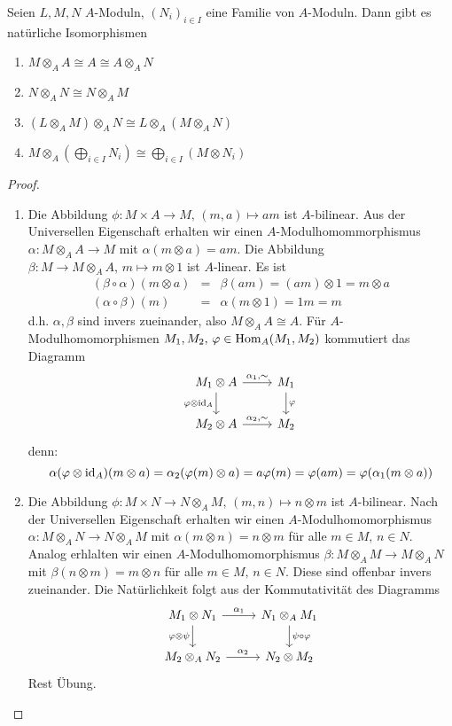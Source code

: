 \begin{bem}\label{13.7}
	Seien $L,M,N$ $A$-Moduln, $(N_i)_{i\in I}$ eine Familie von $A$-Moduln. Dann gibt es natürliche Isomorphismen 
	\begin{enumerate}[label= \alph*)]
		\item $M \otimes_A A \cong A \cong A \otimes_A N$
		\item $N\otimes_A N\cong N \otimes_A M$
		\item $(L\otimes_A M)\otimes_A N \cong L \otimes_A(M \otimes_A N)$
		\item $M \otimes_A \left(\bigoplus_{i\in I} N_i\right) \cong \bigoplus_{i\in I}(M \otimes N_i)$
	\end{enumerate}
\end{bem}
\begin{proof}
	\begin{enumerate}[label= \alph*)]
		\item Die Abbildung $\phi:M \times A \to M, \, (m,a) \mapsto am$ ist $A$-bilinear. Aus der Universellen Eigenschaft erhalten wir einen $A$-Modulhomommorphismus $\alpha:M \otimes_A A \to M$ mit $\alpha(m \otimes a) = am$. Die Abbildung $\beta:M \to M \otimes_A A, \, m \mapsto m \otimes 1$ ist $A$-linear. Es ist 
		\begin{eqnarray*}
		(\beta \circ \alpha)(m \otimes a)& =& \beta(am) = (am) \otimes 1 = m \otimes a\\
		(\alpha \circ \beta)(m) &=& \alpha(m \otimes 1) = 1m = m
		\end{eqnarray*}
	d.h. $\alpha, \beta$ sind invers zueinander, also $M \otimes_AA\cong A$. Für $A$-Modulhomomorphismen $M_1,M_2, \, \varphi\in \operatorname{Hom}_A(M_1, M_2)$ kommutiert das Diagramm
	$$\begin{tikzcd}
	M_1 \otimes A \arrow[swap]{d}{\phi\otimes \id_A}\arrow{r}{\alpha_1, \sim}& M_1\arrow{d}{\phi} \\
	M_2 \otimes A \arrow{r}{\alpha_2, \sim} & M_2
	\end{tikzcd}$$
	denn: 
	$$\alpha(\varphi\otimes \operatorname{id}_A) (m \otimes a) = \alpha_2(\varphi(m) \otimes a) = a\varphi(m) = \varphi(am) = \varphi(\alpha_1(m \otimes a))$$
	\item Die Abbildung $\phi:M \times N \to N \otimes_A M, \, (m,n) \mapsto n \otimes m$ ist $A$-bilinear. Nach der Universellen Eigenschaft erhalten wir einen $A$-Modulhomomorphismus $\alpha:M \otimes_A N \to N \otimes_A M$ mit $\alpha(m \otimes n) = n \otimes m$ für alle $m\in M, \, n\in N$. Analog erhlalten wir einen $A$-Modulhomomorphismus $\beta:M \otimes_A M \to M \otimes_A N$ mit $\beta(n \otimes m) = m \otimes n$ für alle $m\in M, \, n\in N$. Diese sind offenbar invers zueinander. Die Natürlichkeit folgt aus der Kommutativität des Diagramms
	$$\begin{tikzcd}
	M_1 \otimes N_1 \arrow{r}{\alpha_1} \arrow[swap]{d}{\phi \otimes \psi} & N_1 \otimes_A M_1 \arrow{d}{\psi \circ \phi}\\
	M_2 \otimes_A N_2 \arrow{r}{\alpha_2} & N_2  \otimes M_2
	\end{tikzcd}$$
	Rest Übung.
	\end{enumerate}
\end{proof}
